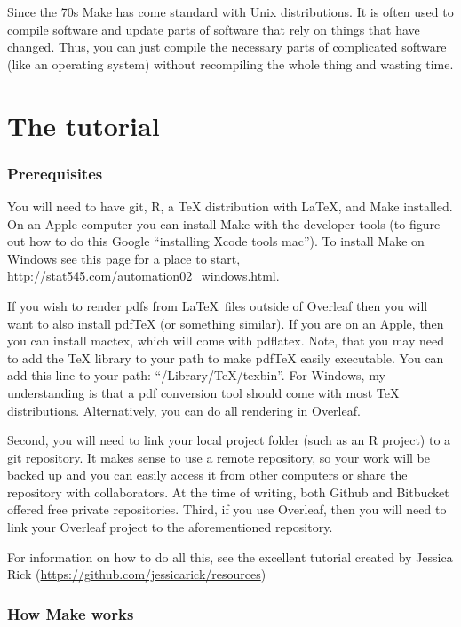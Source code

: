 \documentclass{article}
\begin{document}
Since the 70s {\sf Make} has come standard with {\sf Unix} distributions. It is often used to compile software and update parts of software that rely on things that have changed. Thus, you can just compile the necessary parts of complicated software (like an operating system) without recompiling the whole thing and wasting time.

\section{The tutorial}
\subsubsection{Prerequisites}

You will need to have {\sf git}, {\sf R}, a {\sf TeX} distribution with \LaTeX, and {\sf Make} installed. On an Apple computer you can install {\sf Make} with the developer tools (to figure out how to do this Google ``installing Xcode tools mac''). To install {\sf Make} on Windows see this page for a place to start, \url{http://stat545.com/automation02_windows.html}. 

If you wish to render pdfs from \LaTeX\ files outside of {\sf Overleaf} then you will want to also install {\sf pdfTeX} (or something similar). If you are on an Apple, then you can install {\sf mactex}, which will come with {\sf pdflatex}. Note, that you may need to add the {\sf TeX} library to your path to make {\sf pdfTeX} easily executable. You can add this line to your path: ``/Library/TeX/texbin''. For Windows, my understanding is that a pdf conversion tool should come with most {\sf TeX} distributions. Alternatively, you can do all rendering in {\sf Overleaf}.

Second, you will need to link your local project folder (such as an {\sf R} project) to a {\sf git} repository. It makes sense to use a remote repository, so your work will be backed up and you can easily access it from other computers or share the repository with collaborators. At the time of writing, both {\sf Github} and {\sf Bitbucket} offered free private repositories. Third, if you use {\sf Overleaf}, then you will need to link your {\sf Overleaf} project to the aforementioned repository. 

For information on how to do all this, see the excellent tutorial created by Jessica Rick (\url{https://github.com/jessicarick/resources})

\subsubsection{How {\sf Make} works}
\end{document}
